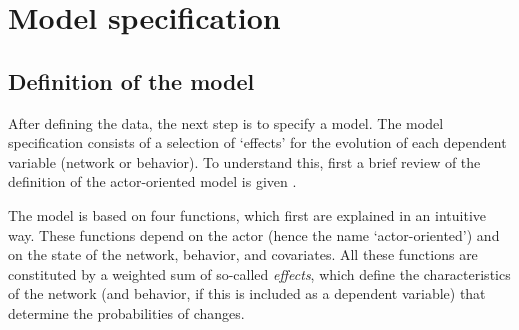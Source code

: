 \documentclass[a4paper,fleqn,11pt]{article}
\newcommand{\+}{\, + \,}
\begin{document}
\newpage
\section{Model specification}
\label{S_modspec}

\subsection{Definition of the model}
\label{S_defmod}

After defining the data, the next step is to specify a model.
The model specification consists of a selection of `effects'
for the evolution of each dependent variable (network or behavior).
To understand this, first a brief review of the definition of the
actor-oriented model is given
\citep*[for further explanations see][]{Snijders01, Snijders05,
SnijdersEA07, SnijdersEA10b}.

The model is based on four functions, which first are explained in an
intuitive way.
These functions depend on the actor (hence the name `actor-oriented')
and on the state of the network, behavior, and covariates.
All these functions are constituted by a weighted sum
of so-called \emph{effects}, which define the characteristics of
the network (and behavior, if this is included as a dependent variable)
that determine the probabilities of changes.
\end{document}
